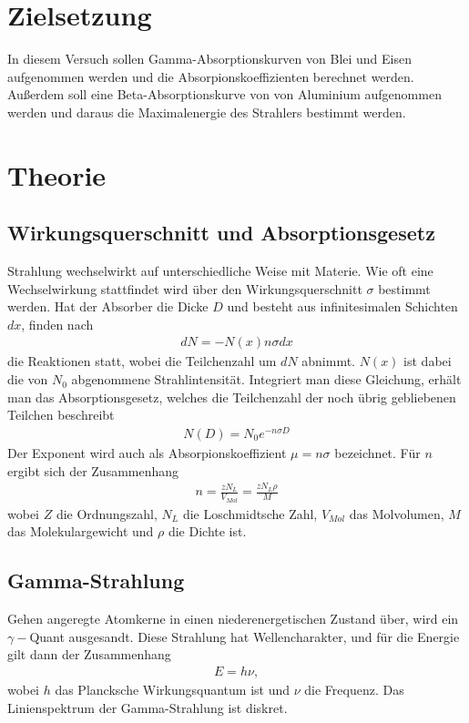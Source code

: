 \section{Zielsetzung}
\label{sec:Zielsetzung}
In diesem Versuch sollen Gamma-Absorptionskurven von Blei und Eisen aufgenommen werden und die Absorpionskoeffizienten berechnet werden.
Außerdem soll eine Beta-Absorptionskurve von von Aluminium aufgenommen werden und daraus die Maximalenergie des Strahlers bestimmt werden.

\section{Theorie}
\label{sec:Theorie}
\subsection{Wirkungsquerschnitt und Absorptionsgesetz}
Strahlung wechselwirkt auf unterschiedliche Weise mit Materie. Wie oft eine Wechselwirkung stattfindet wird über den Wirkungsquerschnitt $\sigma$ bestimmt werden.
Hat der Absorber die Dicke $D$ und besteht aus infinitesimalen Schichten $dx$, finden nach 
\begin{align}
  dN = -N(x)n \sigma dx
\end{align}
die Reaktionen statt, wobei die Teilchenzahl um $dN$ abnimmt. $N(x)$ ist dabei die von $N_0$ abgenommene Strahlintensität.
Integriert man diese Gleichung, erhält man das Absorptionsgesetz, welches die Teilchenzahl der noch übrig gebliebenen Teilchen beschreibt
\begin{align}
  N(D) = N_0 e^{-n  \sigma D}
\end{align}
Der Exponent wird auch als Absorpionskoeffizient $\mu = n \sigma$ bezeichnet.
Für $n$ ergibt sich der Zusammenhang
\begin{align}
  n = \frac{z N_L}{V_{Mol}} = \frac{z N_L \rho}{M}
\end{align}
wobei $Z$ die Ordnungszahl, $N_L$ die Loschmidtsche Zahl, $V_{Mol}$ das Molvolumen, $M$ das Molekulargewicht und $\rho$ die Dichte ist.

\subsection{Gamma-Strahlung}
Gehen angeregte Atomkerne in einen niederenergetischen Zustand über, wird ein $\gamma -$Quant ausgesandt.
Diese Strahlung hat Wellencharakter, und für die Energie gilt dann der Zusammenhang
\begin{align}
  E = h\nu ,
\end{align}
wobei $h$ das Plancksche Wirkungsquantum ist und $\nu$ die Frequenz.
Das Linienspektrum der Gamma-Strahlung ist diskret.


